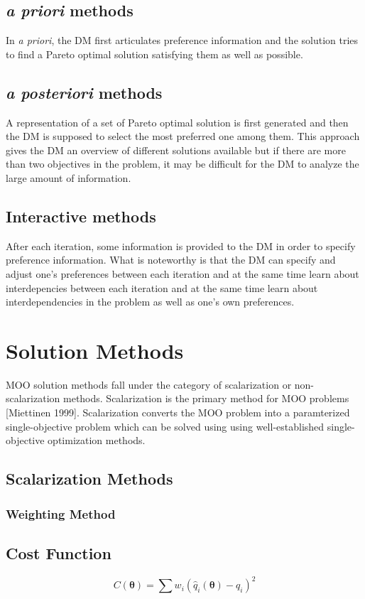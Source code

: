 \subsection{\emph{a priori} methods}
In \emph{a priori}, the DM first articulates preference information and the solution tries to find a Pareto optimal solution satisfying them as well as possible.

\subsection{\emph{a posteriori} methods}
A representation of a set of Pareto optimal solution is first generated and then the DM is supposed to select the most preferred one among them.  This approach gives the DM an overview of different solutions available but if there are more than two objectives in the problem, it may be difficult for the DM to analyze the large amount of information.

\subsection{Interactive methods}
After each iteration, some information is provided to the DM in order to specify preference information.  What is noteworthy is that the DM can specify and adjust one's preferences between each iteration and at the same time learn about interdepencies between each iteration and at the same time learn about interdependencies in the problem as well as one's own preferences.
\section{Solution Methods}
MOO solution methods fall under the category of scalarization or non-scalarization methods.  Scalarization is the primary method for MOO problems [Miettinen 1999].  Scalarization converts the MOO problem into a paramterized single-objective problem which can be solved using using well-established single-objective optimization methods.
\subsection{Scalarization Methods}
\subsubsection{Weighting Method}
\subsection{Cost Function}
\begin{equation}
  C(\bm{\theta})=\sum w_i (\hat{q}_i(\bm{\theta})-q_i)^2
\end{equation}

